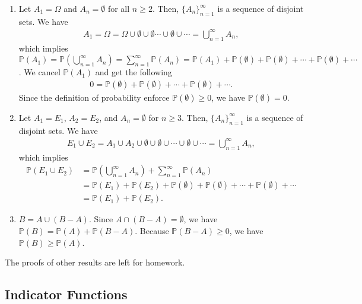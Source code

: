 \documentclass[11pt,letterpaper, leqno]{article}
\numberwithin{equation}{section}
\numberwithin{theorem}{section}
\numberwithin{lemma}{section}
\numberwithin{corollary}{section}
\numberwithin{definition}{section}
\numberwithin{proposition}{section}
\numberwithin{remark}{section}
\numberwithin{example}{section}
\begin{document}
\begin{enumerate}
    \item Let $A_1=\Omega$ and $A_n=\emptyset$ for all $n\ge 2$. Then, $\{A_n\}_{n=1}^\infty$ is a sequence of disjoint sets. We have
    \begin{align*}
        A_1=\Omega=\Omega\cup\emptyset\cup\emptyset\cdots\cup\emptyset\cup\cdots=\bigcup_{n=1}^\infty A_n,
    \end{align*}
    which implies $\mathbb{P}(A_1)=\mathbb{P}(\bigcup_{n=1}^\infty A_n)=\sum_{n=1}^\infty \mathbb{P}(A_n)=\mathbb{P}(A_1)+\mathbb{P}(\emptyset)+\mathbb{P}(\emptyset)+\cdots+\mathbb{P}(\emptyset)+\cdots$. We cancel $\mathbb{P}(A_1)$ and get the following
    \begin{align*}
        0=\mathbb{P}(\emptyset)+\mathbb{P}(\emptyset)+\cdots+\mathbb{P}(\emptyset)+\cdots.
    \end{align*}
    Since the definition of probability enforce $\mathbb{P}(\emptyset)\ge0$, we have $\mathbb{P}(\emptyset)=0$.

\item Let $A_1=E_1$, $A_2=E_2$, and $A_n=\emptyset$ for $n\ge 3$. Then, $\{A_n\}_{n=1}^\infty$ is a sequence of disjoint sets. We have
\begin{align*}
    E_1\cup E_2=A_1\cup A_2 \cup \emptyset \cup \emptyset \cup \cdots \cup \emptyset\cup \cdots=\bigcup_{n=1}^\infty A_n,
\end{align*}
which implies 
\begin{align*}
    \mathbb{P}(E_1\cup E_2) &=\mathbb{P}\left( \bigcup_{n=1}^\infty A_n \right) + \sum_{n=1}^\infty \mathbb{P}(A_n) \\
    &= \mathbb{P}(E_1) + \mathbb{P}(E_2) + \mathbb{P}(\emptyset) + \mathbb{P}(\emptyset) +\cdots + \mathbb{P}(\emptyset)+ \cdots \\
    &= \mathbb{P}(E_1) + \mathbb{P}(E_2).
\end{align*}

\item $B=A\cup (B-A)$. Since $A\cap (B-A)=\emptyset$, we have $\mathbb{P}(B)=\mathbb{P}(A)+\mathbb{P}(B-A)$. Because $\mathbb{P}(B-A)\ge0$, we have $\mathbb{P}(B)\ge\mathbb{P}(A)$.
\end{enumerate}
The proofs of other results are left for homework.

\subsection{Indicator Functions}
\end{document}
